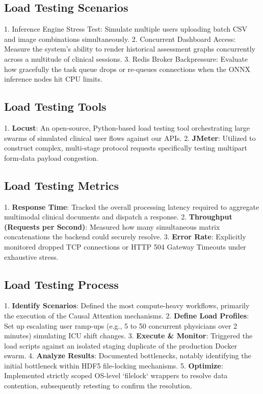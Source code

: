 \documentclass{fisatprojectfinal}
\begin{document}
\subsection*{Load Testing Scenarios}
1. Inference Engine Stress Test: Simulate multiple users uploading batch CSV and image combinations simultaneously.
2. Concurrent Dashboard Access: Measure the system's ability to render historical assessment graphs concurrently across a multitude of clinical sessions.
3. Redis Broker Backpressure: Evaluate how gracefully the task queue drops or re-queues connections when the ONNX inference nodes hit CPU limits.

\subsection*{Load Testing Tools}
1. \textbf{Locust}: An open-source, Python-based load testing tool orchestrating large swarms of simulated clinical user flows against our APIs.
2. \textbf{JMeter}: Utilized to construct complex, multi-stage protocol requests specifically testing multipart form-data payload congestion.

\subsection*{Load Testing Metrics}
1. \textbf{Response Time}: Tracked the overall processing latency required to aggregate multimodal clinical documents and dispatch a response.
2. \textbf{Throughput (Requests per Second)}: Measured how many simultaneous matrix concatenations the backend could securely resolve.
3. \textbf{Error Rate}: Explicitly monitored dropped TCP connections or HTTP 504 Gateway Timeouts under exhaustive stress.

\subsection*{Load Testing Process}
1. \textbf{Identify Scenarios}: Defined the most compute-heavy workflows, primarily the execution of the Causal Attention mechanisms.
2. \textbf{Define Load Profiles}: Set up escalating user ramp-ups (e.g., 5 to 50 concurrent physicians over 2 minutes) simulating ICU shift changes.
3. \textbf{Execute \& Monitor}: Triggered the load scripts against an isolated staging duplicate of the production Docker swarm.
4. \textbf{Analyze Results}: Documented bottlenecks, notably identifying the initial bottleneck within HDF5 file-locking mechanisms.
5. \textbf{Optimize}: Implemented strictly scoped OS-level `filelock` wrappers to resolve data contention, subsequently retesting to confirm the resolution.
\end{document}
